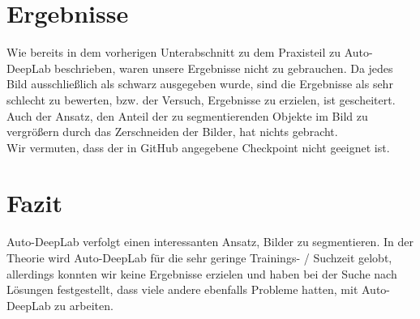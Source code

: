 \section{Ergebnisse}

Wie bereits in dem vorherigen Unterabschnitt zu dem Praxisteil zu Auto-DeepLab beschrieben, waren unsere Ergebnisse nicht zu gebrauchen. Da jedes Bild ausschließlich als schwarz ausgegeben wurde, sind die Ergebnisse als sehr schlecht zu bewerten, bzw. der Versuch, Ergebnisse zu erzielen, ist gescheitert. Auch der Ansatz, den Anteil der zu segmentierenden Objekte im Bild zu vergrößern durch das Zerschneiden der Bilder, hat nichts gebracht.\\
Wir vermuten, dass der in GitHub angegebene Checkpoint nicht geeignet ist.


\section{Fazit}

Auto-DeepLab verfolgt einen interessanten Ansatz, Bilder zu segmentieren. In der Theorie wird Auto-DeepLab für die sehr geringe Trainings- / Suchzeit gelobt, allerdings konnten wir keine Ergebnisse erzielen und haben bei der Suche nach Lösungen festgestellt, dass viele andere ebenfalls Probleme hatten, mit Auto-DeepLab zu arbeiten.

